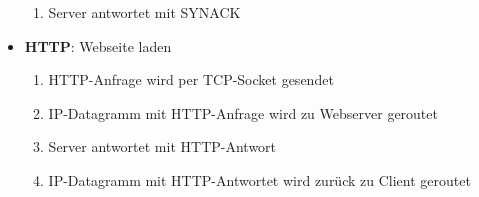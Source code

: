 \begin{itemize}
\begin{enumerate}
    \item Server antwortet mit SYNACK
  \end{enumerate}
  \item \textbf{HTTP}: Webseite laden
  \begin{enumerate}
    \item HTTP-Anfrage wird per TCP-Socket gesendet
    \item IP-Datagramm mit HTTP-Anfrage wird zu Webserver geroutet
    \item Server antwortet mit HTTP-Antwort
    \item IP-Datagramm mit HTTP-Antwortet wird zurück zu Client geroutet
  \end{enumerate}
\end{itemize}